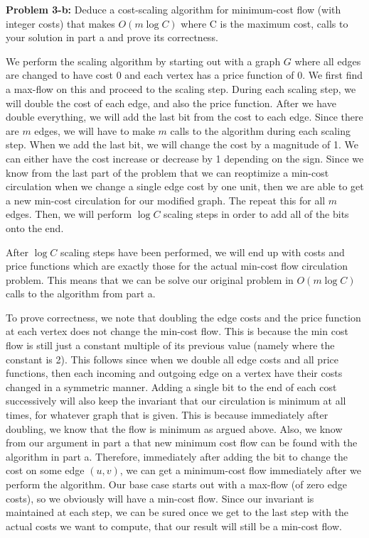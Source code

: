 \documentclass[psamsfonts]{amsart}
\newenvironment{sol}{\vspace{0.25cm}{\large \bfseries Solution:}}{\qedsymbol}
\newenvironment{prob}[1]{\begin{framed}{\large \bfseries Problem #1:}}{\end{framed}}
\begin{document}
\begin{prob}{3-b}
Deduce a cost-scaling algorithm for minimum-cost flow (with integer costs) that makes $O(m \log C)$ where C is the maximum cost, calls to your solution in part a and prove its correctness.
\end{prob}

\begin{sol}
We perform the scaling algorithm by starting out with a graph $G$ where all edges are changed to have cost $0$ and each vertex has a price function of $0$. We first find a max-flow on this and proceed to the scaling step. During each scaling step, we will double the cost of each edge, and also the price function. After we have double everything, we will add the last bit from the cost to each edge. Since there are $m$ edges, we will have to make $m$ calls to the algorithm during each scaling step. When we add the last bit, we will change the cost by a magnitude of 1. We can either have the cost increase or decrease by 1 depending on the sign. Since we know from the last part of the problem that we can reoptimize a min-cost circulation when we change a single edge cost by one unit, then we are able to get a new min-cost circulation for our modified graph. The repeat this for all $m$ edges. Then, we will perform $\log C$ scaling steps in order to add all of the bits onto the end.

After $\log C$ scaling steps have been performed, we will end up with costs and price functions which are exactly those for the actual min-cost flow circulation problem. This means that we can be solve our original problem in $O(m \log C)$ calls to the algorithm from part a.

To prove correctness, we note that doubling the edge costs and the price function at each vertex does not change the min-cost flow. This is because the min cost flow is still just a constant multiple of its previous value (namely where the constant is 2). This follows since when we double all edge costs and all price functions, then each incoming and outgoing edge on a vertex have their costs changed in a symmetric manner. Adding a single bit to the end of each cost successively will also keep the invariant that our circulation is minimum at all times, for whatever graph that is given. This is because immediately after doubling, we know that the flow is minimum as argued above. Also, we know from our argument in part a that new minimum cost flow can be found with the algorithm in part a. Therefore, immediately after adding the bit to change the cost on some edge $(u,v)$, we can get a minimum-cost flow immediately after we perform the algorithm. Our base case starts out with a max-flow (of zero edge costs), so we obviously will have a min-cost flow. Since our invariant is maintained at each step, we can be sured once we get to the last step with the actual costs we want to compute, that our result will still be a min-cost flow.  
\end{sol}
\end{document}
